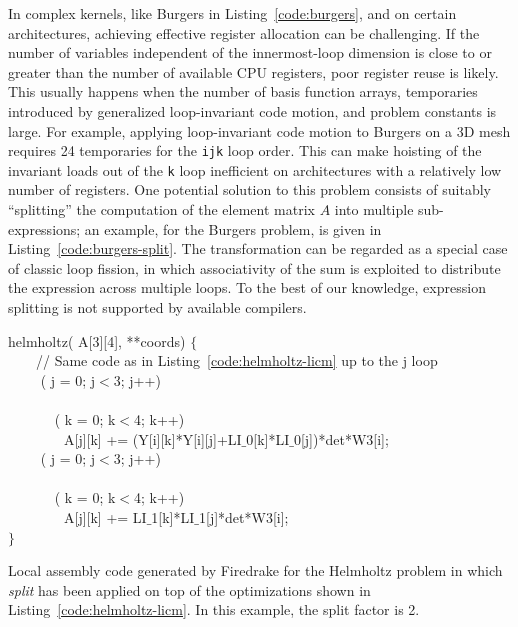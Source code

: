 In complex kernels, like Burgers in Listing~\ref{code:burgers}, and on certain architectures, achieving effective register allocation can be challenging. If the number of variables independent of the innermost-loop dimension is close to or greater than the number of available CPU registers, poor register reuse is likely. This usually happens when the number of basis function arrays, temporaries introduced by generalized loop-invariant code motion, and problem constants is large. For example, applying loop-invariant code motion to Burgers on a 3D mesh requires 24 temporaries for the \texttt{ijk} loop order. This can make hoisting of the invariant loads out of the \texttt{k} loop inefficient on architectures with a relatively low number of registers. One potential solution to this problem consists of suitably ``splitting'' the computation of the element matrix $A$ into multiple sub-expressions; an example, for the Burgers problem, is given in Listing~\ref{code:burgers-split}. The transformation can be regarded as a special case of classic loop fission, in which associativity of the sum is exploited to distribute the expression across multiple loops. To the best of our knowledge, expression splitting is not supported by available compilers.

\begin{algorithm}
\scriptsize\ttfamily
{}

 helmholtz( A[3][4],  **coords) $\lbrace$\\
~~~~// Same code as in Listing~\ref{code:helmholtz-licm} up to the j loop\\
~~~~ ( j = 0; j$<$3; j++) \\
~~~~~~\\
~~~~~~ ( k = 0; k$<$4; k++) \\
~~~~~~~~A[j][k] += (Y[i][k]*Y[i][j]+LI$\_$0[k]*LI$\_$0[j])*det*W3[i];\\
~~~~ ( j = 0; j$<$3; j++) \\
~~~~~~\\
~~~~~~ ( k = 0; k$<$4; k++) \\
~~~~~~~~A[j][k] += LI$\_$1[k]*LI$\_$1[j]*det*W3[i];\\
$\rbrace$
\caption{Local assembly code generated by Firedrake for the Helmholtz
  problem in which \emph{split} has been applied on top of the
  optimizations shown in Listing~\ref{code:helmholtz-licm}. In this
  example, the split factor is 2.}
\label{code:helmholtz-split}
\end{algorithm}

